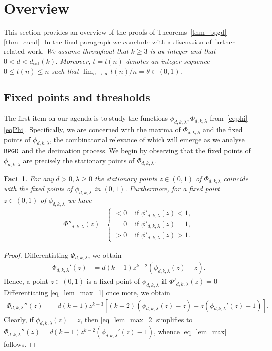 \documentclass[10pt,reqno]{amsart}
\numberwithin{equation}{section}
\newcommand\dsat{d_{\mathrm{sat}}}
\newcommand{\BPGD}{\ensuremath{\mathtt{BPGD}}}
\newcommand\bc[1]{\left({#1}\right)}
\newcommand\brk[1]{\left\lbrack{#1}\right\rbrack}
\newcommand\Thm{Theorem}
\newtheorem{fact}[definition]{Fact}
\newcommand{\ph}{\phi_{d,k,\lambda}}
\newcommand{\Ph}{\Phi_{d,k,\lambda}}
\begin{document}
\section{Overview}\label{sec_over}

\noindent
This section provides an overview of the proofs of \Thm s~\ref{thm_bpgd}--\ref{thm_cond}.
In the final paragraph we conclude with a discussion of further related work.
{\em We assume throughout that $k\geq3$ is an integer and that $0<d<\dsat(k)$. Moreover, $t=t(n)$ denotes an integer sequence $0\leq t(n)\leq n$ such that $\lim_{n\to\infty}t(n)/n=\theta\in(0,1)$.}


\subsection{Fixed points and thresholds}\label{sec_calc}
The first item on our agenda is to study the functions $\ph,\Ph$ from~\eqref{eqphi}--\eqref{eqPhi}.
Specifically, we are concerned with the maxima of $\Ph$ and the fixed points of $\ph$, the combinatorial relevance of which will emerge as we analyse \BPGD\ and the decimation process.
We begin by observing that the fixed points of $\ph$ are precisely the stationary points of $\Ph$.

\begin{fact}\label{lem_max}
	For any $d>0,\lambda\geq0$ the stationary points $z\in(0,1)$ of $\Phi_{d,k,\lambda}$ coincide with the fixed points of $\phi_{d,k,\lambda}$ in $(0,1)$.
	Furthermore, for a fixed point $z\in(0,1)$ of $\phi_{d,k,\lambda}$ we have
	\begin{align}\label{eq_lem_max}
		\Phi''_{d,k,\lambda}(z)&\begin{cases}
			<0&\mbox{ if }\phi'_{d,k,\lambda}(z)<1,\\
			=0&\mbox{ if }\phi'_{d,k,\lambda}(z)=1,\\
			>0&\mbox{ if }\phi'_{d,k,\lambda}(z)>1.
			\end{cases}
	\end{align}
\end{fact}
\begin{proof}
	Differentiating $\Phi_{d,k,\lambda}$, we obtain
	\begin{align}\label{eq_lem_max_1}
		\Phi_{d,k,\lambda}'(z)&=d(k-1)z^{k-2}\bc{\phi_{d,k,\lambda}(z)-z}.
	\end{align}
	Hence, a point $z\in(0,1)$ is a fixed point of $\phi_{d,k,\lambda}$ iff $\Phi'_{d,k,\lambda}(z)=0$.
	Differentiating \eqref{eq_lem_max_1} once more, we obtain
	\begin{align}\label{eq_lem_max_2}
		\Phi_{d,k,\lambda}''(z)&=d(k-1)z^{k-3}\brk{(k-2)\bc{\phi_{d,k,\lambda}(z)-z}
		+z\bc{\phi_{d,k,\lambda}'(z)-1}}.
	\end{align}
	Clearly, if $\phi_{d,k,\lambda}(z)=z$, then \eqref{eq_lem_max_2} simplifies to $\Phi_{d,k,\lambda}''(z)=d(k-1)z^{k-2}(\phi_{d,k,\lambda}'(z)-1)$, whence \eqref{eq_lem_max} follows.
\end{proof}
\end{document}
